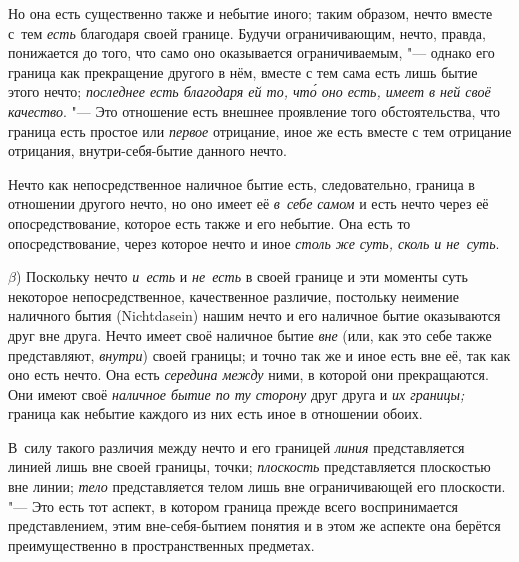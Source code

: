 Но она есть существенно также и небытие иного; таким образом, нечто вместе
с~тем {\em есть} благодаря своей границе. Будучи ограничивающим, нечто, правда,
понижается до того, что само оно оказывается ограничиваемым, "--- однако его
граница как прекращение другого в нём, вместе с тем сама есть лишь бытие этого
нечто; {\em последнее есть благодаря ей то, чт\'{о} оно есть, имеет в ней своё
качество}. "--- Это отношение есть внешнее проявление того обстоятельства, что
граница есть простое или {\em первое} отрицание, иное же есть вместе с тем
отрицание отрицания, внутри-себя-бытие данного нечто.

Нечто как непосредственное наличное бытие есть, следовательно, граница
в отношении другого нечто, но оно имеет её {\em в~себе самом} и есть нечто
через её опосредствование, которое есть также и его небытие. Она есть то
опосредствование, через которое нечто и иное
{\em столь же суть, сколь и не~суть}.

$\beta$) Поскольку нечто {\em и~есть} и {\em не~есть} в своей
границе и эти моменты суть некоторое непосредственное, качественное различие,
постольку неимение наличного бытия (Nicht\-dasein) нашим нечто и его наличное
бытие оказываются друг вне друга. Нечто имеет своё наличное бытие {\em вне}
(или, как это себе также представляют, {\em внутри}) своей границы; и точно так
же и иное есть вне её, так как оно есть нечто. Она есть {\em середина между}
ними, в которой они прекращаются. Они имеют своё {\em наличное бытие по ту
сторону} друг друга и {\em их границы;} граница как небытие каждого из них есть
иное в отношении обоих.

В~силу такого различия между нечто и его границей {\em линия} представляется
линией лишь вне своей границы, точки; {\em плоскость} представляется плоскостью
вне линии; {\em тело} представляется телом лишь вне ограничивающей его
плоскости. "--- Это есть тот аспект, в котором граница прежде всего
воспринимается представлением, этим вне-себя-бытием понятия и в этом же аспекте
она берётся преимущественно в пространственных предметах.

